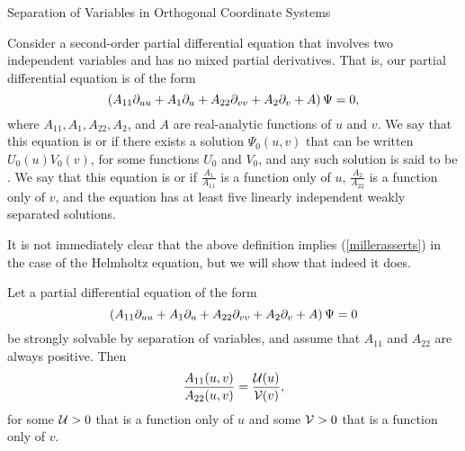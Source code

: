 \begin{section}{Separation of Variables in Orthogonal Coordinate Systems}
\begin{definition}
\label{sepofvard}
Consider a second-order partial differential equation that involves two independent variables and has no mixed partial derivatives.  That is, our partial differential equation is of the form
\[
\left( A_{11} \partial_{u u} + A_1 \partial_{u} + A_{22} \partial_{v v} + A_2 \partial_{v} + A \right) \Psi = 0,
\]
where $A_{11}, A_1, A_{22}, A_2$, and $A$ are real-analytic functions of $u$ and $v$.  We say that this equation is   or  if there exists a solution $\Psi_0(u,v)$ that can be written $U_0(u)V_0(v)$, for some functions $U_0$ and $V_0$, and any such solution is said to be .  We say that this equation is  or  if $\frac{A_1}{A_{11}}$ is a function only of $u$, $\frac{A_2}{A_{22}}$ is a function only of $v$, and the equation has at least five linearly independent weakly separated solutions.
\end{definition}

It is not immediately clear that the above definition implies (\ref{millerasserts}) in the case of the Helmholtz equation, but we will show that indeed it does.

\begin{lemma}
\label{helmstrong}
Let a partial differential equation of the form
\begin{equation}
\label{genpde}
\left( A_{11} \partial_{u u} + A_1 \partial_{u} + A_{22} \partial_{v v} + A_2 \partial_{v} + A \right) \Psi = 0
\end{equation}
be strongly solvable by separation of variables, and assume that $A_{11}$ and $A_{22}$ are always positive.  Then
\[
\frac{A_{11}(u,v)}{A_{22}(u,v)} = \frac{\mathcal{U}(u)}{\mathcal{V}(v)},
\]
for some $\mathcal{U} > 0$ that is a function only of $u$ and some $\mathcal{V} > 0$ that is a function only of $v$.
\end{lemma}


\end{section}
